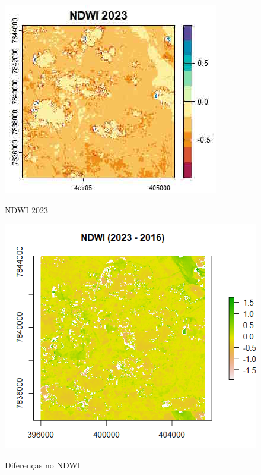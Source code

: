  			\begin{minipage}[t!]{0.31\textwidth}
 				
 				\begin{figure}[H]
 					\centering \small \caption{NDWI 2023}
 					\includegraphics[width=0.97\linewidth]{FIGURAS/Rplot0ndwi2023}
 					\label{fig:rplot0ndwi2023}
 				\end{figure}			
 				
 			\end{minipage} 
 			\begin{minipage}[t!]{0.31\textwidth}
 				
 				\begin{figure}[H]
 					\centering \small \caption{Diferenças no NDWI}
 					\includegraphics[width=0.97\linewidth]{FIGURAS/difer202332026}
 					\label{fig:difer202332026}
 				\end{figure}		
 			\end{minipage} 
 			
